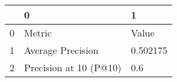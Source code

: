 \begin{tabular}{lll}
\toprule
{} &                       0 &         1 \\
\midrule
0 &                  Metric &     Value \\
1 &       Average Precision &  0.502175 \\
2 &  Precision at 10 (P@10) &       0.6 \\
\bottomrule
\end{tabular}
